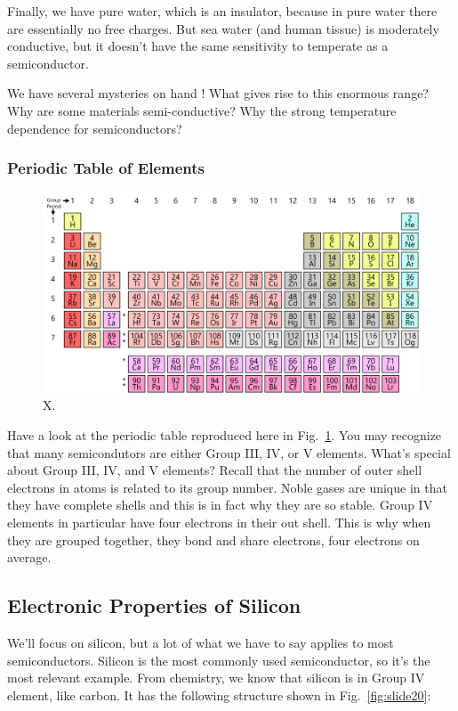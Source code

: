 Finally, we have pure water, which is an insulator, because in pure water there are essentially no free charges.  But sea water (and human tissue) is moderately conductive, but it doesn't have the same sensitivity to temperate as a semiconductor. 

We have several mysteries on hand ! 
 What gives rise to this enormous range?
 Why are some materials semi-conductive?
 Why the strong temperature dependence for semiconductors?
 
 
 \subsubsection{Periodic Table of Elements}


\begin{figure}
\begin{center}
\includegraphics[width=.5\columnwidth]{periodic_table}
\end{center}
\caption{X. } \label{fig:periodic_table}
\end{figure}

Have a look at the periodic table reproduced here in Fig.~\ref{fig:periodic_table}.  You may recognize that many semicondutors are either Group III, IV, or V elements.   What's special about Group III, IV, and V elements?  Recall that the number of outer shell electrons in atoms is related to its group number.  Noble gases are unique in that they have complete shells and this is in fact why they are so stable.  Group IV elements in particular have four electrons in their out shell.  This is why when they are grouped together, they bond and share electrons, four electrons on average.


\subsection{Electronic Properties of Silicon}
  
We'll focus on silicon, but a lot of what we have to say applies to most semiconductors.  Silicon is the most commonly used semiconductor, so it's the most relevant example.  From chemistry, we know that silicon is in Group IV element, like carbon.  It has the following structure shown in Fig.~\ref{fig:slide20}:
  
